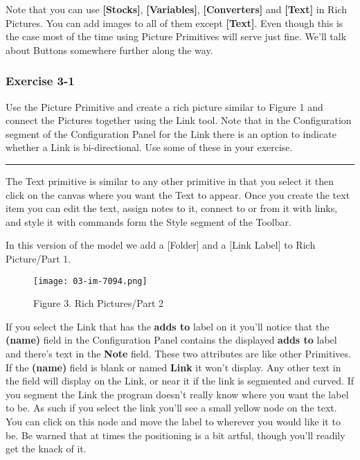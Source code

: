 \documentclass[]{memoir}
\makeatletter
\def\maxwidth{\ifdim\Gin@nat@width>\linewidth\linewidth
\else\Gin@nat@width\fi}
\let\Oldincludegraphics\includegraphics
\renewcommand{\includegraphics}[1]{\Oldincludegraphics[width=\maxwidth]{#1}}
\newcommand{\p}[1]{\textbf{{[}#1{]}}}
\renewcommand{\a}[1]{\textbf{#1}}
\makeatother
\begin{document}
Note that you can use \p{Stocks}, \p{Variables}, \p{Converters} and
\p{Text} in Rich Pictures. You can add images to all of them except
\p{Text}. Even though this is the case most of the time using Picture
Primitives will serve just fine. We'll talk about Buttons somewhere
further along the way.

\subsubsection{Exercise 3-1}

Use the Picture Primitive and create a rich picture similar to Figure 1
and connect the Pictures together using the Link tool. Note that in the
Configuration segment of the Configuration Panel for the Link there is
an option to indicate whether a Link is bi-directional. Use some of
these in your exercise.

\begin{center}\rule{3in}{0.4pt}\end{center}

The Text primitive is similar to any other primitive in that you select
it then click on the canvas where you want the Text to appear. Once you
create the text item you can edit the text, assign notes to it, connect
to or from it with links, and style it with commands form the Style
segment of the Toolbar.

In this version of the model we add a {[}Folder{]} and a {[}Link
Label{]} to Rich Picture/Part 1.

\begin{figure}[htbp]
\centering
\texttt{[image: 03-im-7094.png]}
\caption{Figure 3. Rich Pictures/Part 2}
\end{figure}

If you select the Link that has the \a{adds to} label on it you'll
notice that the \a{(name)} field in the Configuration Panel contains the
displayed \a{adds to} label and there's text in the \a{Note} field.
These two attributes are like other Primitives. If the \a{(name)} field
is blank or named \a{Link} it won't display. Any other text in the field
will display on the Link, or near it if the link is segmented and
curved. If you segment the Link the program doesn't really know where
you want the label to be. As such if you select the link you'll see a
small yellow node on the text. You can click on this node and move the
label to wherever you would like it to be. Be warned that at times the
positioning is a bit artful, though you'll readily get the knack of it.
\end{document}
